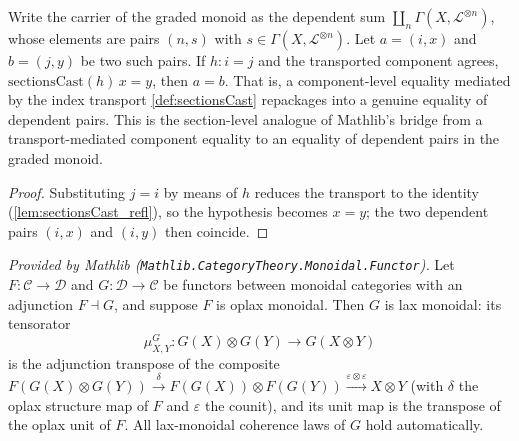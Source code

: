 \begin{lemma}
  \label{lem:gradedMonoid_eq_of_cast}
  Write the carrier of the graded monoid as the dependent sum
  \(\coprod_{n} \Gamma(X, \mathcal{L}^{\otimes n})\), whose elements are pairs
  \((n, s)\) with \(s \in \Gamma(X, \mathcal{L}^{\otimes n})\). Let
  \(a = (i, x)\) and \(b = (j, y)\) be two such pairs. If \(h : i = j\) and the
  transported component agrees, \(\mathrm{sectionsCast}(h)\,x = y\), then
  \(a = b\). That is, a component-level equality mediated by the index transport
  \cref{def:sectionsCast} repackages into a genuine equality of dependent pairs.
  This is the section-level analogue of Mathlib's bridge from a transport-mediated
  component equality to an equality of dependent pairs in the graded monoid.
\end{lemma}

\begin{proof}
  Substituting \(j = i\) by means of \(h\) reduces the transport to the identity
  (\cref{lem:sectionsCast_refl}), so the hypothesis becomes \(x = y\); the two
  dependent pairs \((i, x)\) and \((i, y)\) then coincide.
\end{proof}

\begin{theorem}
  \label{thm:rightAdjointLaxMonoidal_mathlib}
  \mathlibok
  \textit{Provided by Mathlib (\texttt{Mathlib.CategoryTheory.Monoidal.Functor}).}
  Let \(F : \mathcal{C} \to \mathcal{D}\) and \(G : \mathcal{D} \to \mathcal{C}\)
  be functors between monoidal categories with an adjunction \(F \dashv G\), and
  suppose \(F\) is oplax monoidal. Then \(G\) is lax monoidal: its tensorator
  \[
    \mu^{G}_{X,Y} : G(X) \otimes G(Y) \longrightarrow G(X \otimes Y)
  \]
  is the adjunction transpose of the composite
  \(F(G(X) \otimes G(Y)) \xrightarrow{\delta} F(G(X)) \otimes F(G(Y))
  \xrightarrow{\varepsilon \otimes \varepsilon} X \otimes Y\) (with \(\delta\) the
  oplax structure map of \(F\) and \(\varepsilon\) the counit), and its unit map is
  the transpose of the oplax unit of \(F\). All lax-monoidal coherence laws of
  \(G\) hold automatically.
\end{theorem}

